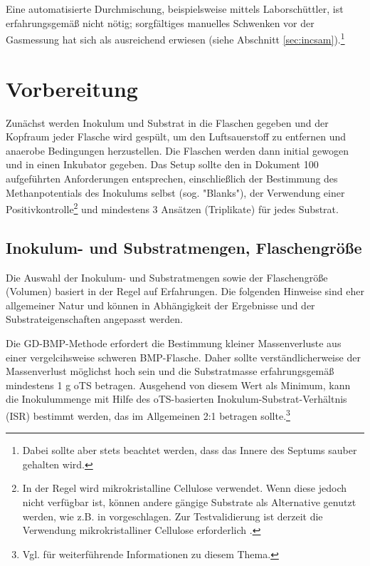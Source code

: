 \documentclass[]{article}
\begin{document}
Eine automatisierte Durchmischung, beispielsweise mittels Laborschüttler, ist erfahrungsgemäß nicht nötig; sorgfältiges manuelles Schwenken vor der Gasmessung hat sich als ausreichend erwiesen (siehe Abschnitt \ref{sec:incsam}).\footnote{Dabei sollte aber stets beachtet werden, dass das Innere des Septums sauber gehalten wird.}

\section{Vorbereitung}
\label{sec:setup}
Zunächst werden Inokulum und Substrat in die Flaschen gegeben und der Kopfraum jeder Flasche wird gespült, um den Luftsauerstoff zu entfernen und anaerobe Bedingungen herzustellen.
Die Flaschen werden dann initial gewogen und in einen Inkubator gegeben.
Das Setup sollte den in Dokument 100 \citep{BMPdoc100req} aufgeführten Anforderungen entsprechen, einschließlich der Bestimmung des Methanpotentials des Inokulums selbst (sog. "Blanks"), der Verwendung einer Positivkontrolle\footnote{In der Regel wird mikrokristalline Cellulose verwendet. Wenn diese jedoch nicht verfügbar ist, können andere gängige Substrate als Alternative genutzt werden, wie z.B. in \citet{kochEvaluationCommonSupermarket2020} vorgeschlagen. Zur Testvalidierung ist derzeit die Verwendung mikrokristalliner Cellulose erforderlich \citep{BMPdoc100req}.}
und mindestens 3 Ansätzen (Triplikate) für jedes Substrat.

\subsection{Inokulum- und Substratmengen,  Flaschengröße}
\label{sec:quantities}
Die Auswahl der Inokulum- und Substratmengen sowie der Flaschengröße (Volumen) basiert in der Regel auf Erfahrungen.
Die folgenden Hinweise sind eher allgemeiner Natur und können in Abhängigkeit der Ergebnisse und der Substrateigenschaften angepasst werden.

Die GD-BMP-Methode erfordert die Bestimmung kleiner Massenverluste aus einer vergelcihsweise schweren BMP-Flasche. Daher sollte verständlicherweise der Massenverlust möglichst hoch sein und die Substratmasse erfahrungsgemäß mindestens 1 g oTS betragen.
Ausgehend von diesem Wert als Minimum, kann die Inokulummenge mit Hilfe des oTS-basierten Inokulum-Substrat-Verhältnis (ISR) bestimmt werden, das im Allgemeinen 2:1 betragen sollte.\footnote{Vgl. \citet{holligerStandardizationBiomethanePotential2016} für weiterführende Informationen zu diesem Thema.}
\end{document}
